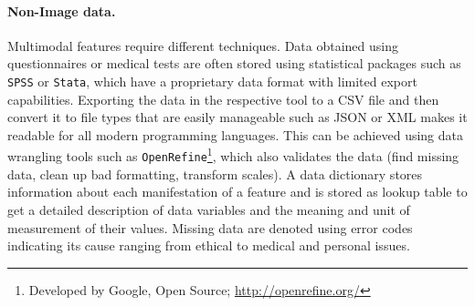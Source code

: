 \documentclass[journal]{style/vgtc} 			          %
\begin{document}
\paragraph{Non-Image data. }
%
Multimodal features require different techniques.
%
Data obtained using questionnaires or medical tests are often stored using statistical packages such as \texttt{SPSS} or \texttt{Stata}, which have a proprietary data format with limited export capabilities.
%
Exporting the data in the respective tool to a CSV file and then convert it to file types that are easily manageable such as JSON or XML makes it readable for all modern programming languages.
%
This can be achieved using data wrangling tools such as \texttt{OpenRefine}\footnote{Developed by Google, Open Source; \url{http://openrefine.org/}}, which also validates the data (find missing data, clean up bad formatting, transform scales).
%
A data dictionary stores information about each manifestation of a feature and is stored as lookup table to get a detailed description of data variables and the meaning and unit of measurement of their values.
%
Missing data are denoted using error codes indicating its cause ranging from ethical to medical and personal issues.
%
\end{document}

